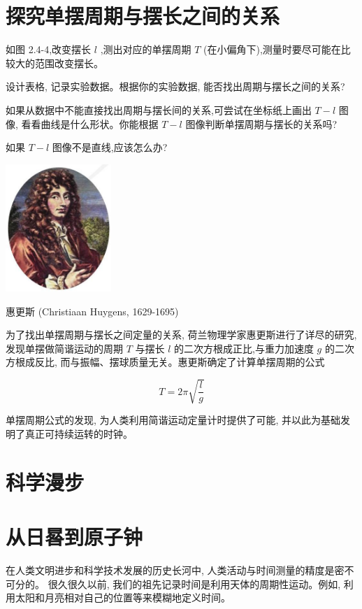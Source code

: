 \documentclass[10pt]{article}
\begin{document}
\section*{探究单摆周期与摆长之间的关系}

如图 2.4-4,改变摆长 \(l\) ,测出对应的单摆周期 \(T\) (在小偏角下),测量时要尽可能在比较大的范围改变摆长。

设计表格, 记录实验数据。根据你的实验数据, 能否找出周期与摆长之间的关系?

如果从数据中不能直接找出周期与摆长间的关系,可尝试在坐标纸上画出 \(T - l\) 图像, 看看曲线是什么形状。你能根据 \(T - l\) 图像判断单摆周期与摆长的关系吗?

如果 \(T - l\) 图像不是直线,应该怎么办?

\begin{center}
\includegraphics[max width=0.3\textwidth]{images/01910e4c-ebb8-7d2c-8f2f-2375bc1d2d12_53_462764.jpg}
\end{center}

惠更斯 (Christiaan Huygens, 1629-1695)

为了找出单摆周期与摆长之间定量的关系, 荷兰物理学家惠更斯进行了详尽的研究, 发现单摆做简谐运动的周期 \(T\) 与摆长 \(l\) 的二次方根成正比,与重力加速度 \(g\) 的二次方根成反比, 而与振幅、摆球质量无关。惠更斯确定了计算单摆周期的公式

\[
T = {2\pi }\sqrt{\frac{l}{g}}
\]

单摆周期公式的发现, 为人类利用简谐运动定量计时提供了可能, 并以此为基础发明了真正可持续运转的时钟。

\section*{科学漫步}

\section*{从日晷到原子钟}

在人类文明进步和科学技术发展的历史长河中, 人类活动与时间测量的精度是密不可分的。 很久很久以前, 我们的祖先记录时间是利用天体的周期性运动。例如, 利用太阳和月亮相对自己的位置等来模糊地定义时间。
\end{document}
